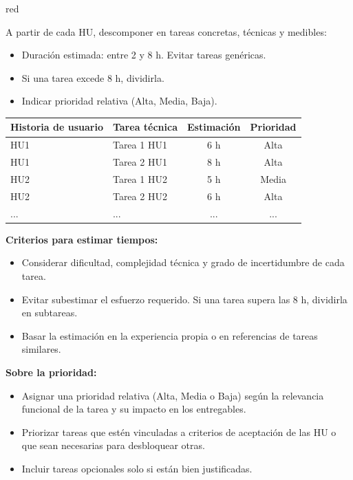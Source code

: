 \documentclass[
11pt, %
]{charter}
\begin{document}
\begin{consigna}{red} %

A partir de cada HU, descomponer en tareas concretas, técnicas y medibles:

\begin{itemize}
  \item Duración estimada: entre 2 y 8 h. Evitar tareas genéricas.
  \item Si una tarea excede 8 h, dividirla.
  \item Indicar prioridad relativa (Alta, Media, Baja).
\end{itemize}

\begin{table}[htpb]
\centering
\begin{tabularx}{\linewidth}{@{}|X|X|c|c|@{}}
\hline
\rowcolor[HTML]{C0C0C0}
Historia de usuario & Tarea técnica & Estimación & Prioridad \\ \hline
HU1 & Tarea 1 HU1 & 6 h & Alta \\ \hline
HU1 & Tarea 2 HU1 & 8 h & Alta \\ \hline
HU2 & Tarea 1 HU2 & 5 h & Media \\ \hline
HU2 & Tarea 2 HU2 & 6 h & Alta \\ \hline
... & ... & ... & ... \\ \hline
\end{tabularx}
\end{table}

\textbf{Criterios para estimar tiempos:}
\begin{itemize}
  \item Considerar dificultad, complejidad técnica y grado de incertidumbre de cada tarea.
  \item Evitar subestimar el esfuerzo requerido. Si una tarea supera las 8 h, dividirla en subtareas.
  \item Basar la estimación en la experiencia propia o en referencias de tareas similares.
\end{itemize}

\textbf{Sobre la prioridad:}
\begin{itemize}
  \item Asignar una prioridad relativa (Alta, Media o Baja) según la relevancia funcional de la tarea y su impacto en los entregables.
  \item Priorizar tareas que estén vinculadas a criterios de aceptación de las HU o que sean necesarias para desbloquear otras.
  \item Incluir tareas opcionales solo si están bien justificadas.
\end{itemize}


\end{consigna}
\end{document}
